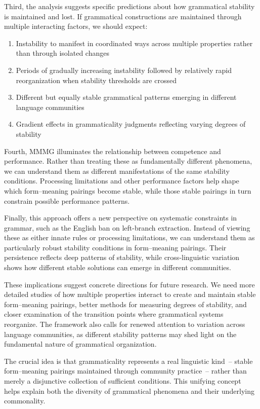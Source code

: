 \documentclass[12pt,letterpaper]{article}
\begin{document}
Third, the analysis suggests specific predictions about how grammatical stability is maintained and lost. If grammatical constructions are maintained through multiple interacting factors, we should expect:
\begin{enumerate}
    \item Instability to manifest in coordinated ways across multiple properties rather than through isolated changes
    \item Periods of gradually increasing instability followed by relatively rapid reorganization when stability thresholds are crossed
    \item Different but equally stable grammatical patterns emerging in different language communities
    \item Gradient effects in grammaticality judgments reflecting varying degrees of stability
\end{enumerate}

Fourth, MMMG illuminates the relationship between competence and performance. Rather than treating these as fundamentally different phenomena, we can understand them as different manifestations of the same stability conditions. Processing limitations and other performance factors help shape which form--meaning pairings become stable, while those stable pairings in turn constrain possible performance patterns.

Finally, this approach offers a new perspective on systematic constraints in grammar, such as the English ban on left-branch extraction. Instead of viewing these as either innate rules or processing limitations, we can understand them as particularly robust stability conditions in form--meaning pairings. Their persistence reflects deep patterns of stability, while cross-linguistic variation shows how different stable solutions can emerge in different communities.

These implications suggest concrete directions for future research. We need more detailed studies of how multiple properties interact to create and maintain stable form--meaning pairings, better methods for measuring degrees of stability, and closer examination of the transition points where grammatical systems reorganize. The framework also calls for renewed attention to variation across language communities, as different stability patterns may shed light on the fundamental nature of grammatical organization.

The crucial idea is that grammaticality represents a real linguistic kind~-- stable form--meaning pairings maintained through community practice~-- rather than merely a disjunctive collection of sufficient conditions. This unifying concept helps explain both the diversity of grammatical phenomena and their underlying commonality.
\end{document}
